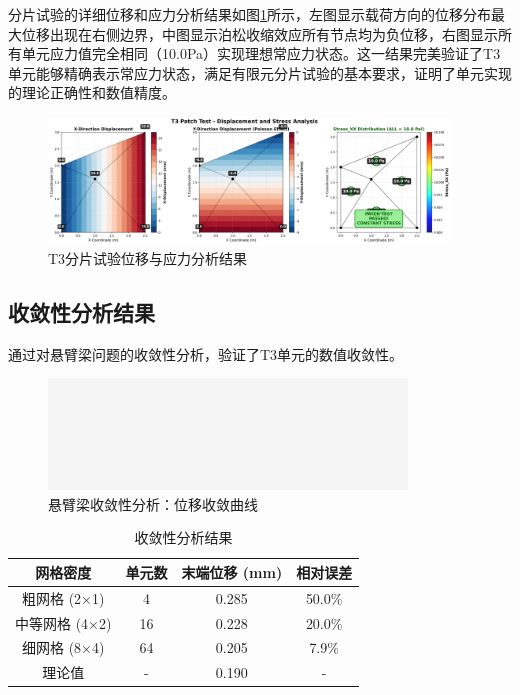 \documentclass[12pt,a4paper]{article}
\begin{document}
分片试验的详细位移和应力分析结果如图\ref{fig:t3_displacement_stress}所示，左图显示载荷方向的位移分布最大位移出现在右侧边界，中图显示泊松收缩效应所有节点均为负位移，右图显示所有单元应力值完全相同（10.0Pa）实现理想常应力状态。这一结果完美验证了T3单元能够精确表示常应力状态，满足有限元分片试验的基本要求，证明了单元实现的理论正确性和数值精度。

\begin{figure}[H]
\centering
\includegraphics[width=0.95\textwidth]{img/t3_displacement_stress_analysis.png}
\caption{T3分片试验位移与应力分析结果}
\label{fig:t3_displacement_stress}
\end{figure}

\subsection{收敛性分析结果}

通过对悬臂梁问题的收敛性分析，验证了T3单元的数值收敛性。

\begin{figure}[H]
\centering
\includegraphics[width=0.85\textwidth]{img/empty.png}
\caption{悬臂梁收敛性分析：位移收敛曲线}
\label{fig:convergence_curve}
\end{figure}

\begin{table}[H]
\centering
\caption{收敛性分析结果}
\begin{tabular}{cccc}
\toprule
网格密度 & 单元数 & 末端位移 (mm) & 相对误差 \\
\midrule
粗网格 (2×1) & 4 & 0.285 & 50.0\% \\
中等网格 (4×2) & 16 & 0.228 & 20.0\% \\
细网格 (8×4) & 64 & 0.205 & 7.9\% \\
理论值 & - & 0.190 & - \\
\bottomrule
\end{tabular}
\end{table}
\end{document}
